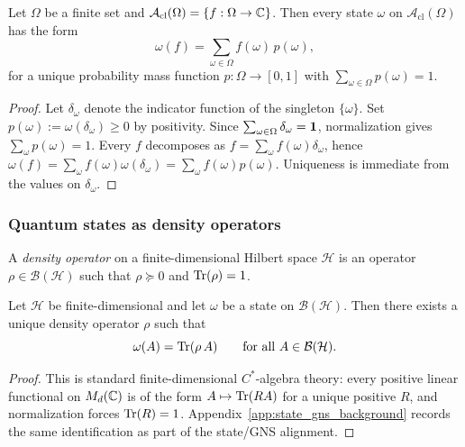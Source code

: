 \begin{proposition}\label{prop:finite_commutative_state_probability}
\MathTag Let $\Omega$ be a finite set and $\mathcal{A}_{\mathrm{cl}}(\Omega)=\{f:\Omega\to\mathbb{C}\}$.
Then every state $\omega$ on $\mathcal{A}_{\mathrm{cl}}(\Omega)$ has the form
\[
\omega(f)=\sum_{\omega\in\Omega} f(\omega)\,p(\omega),
\]
for a unique probability mass function $p:\Omega\to[0,1]$ with $\sum_{\omega\in\Omega}p(\omega)=1$.
\end{proposition}
\begin{proof}
Let $\delta_\omega$ denote the indicator function of the singleton $\{\omega\}$.
Set $p(\omega):=\omega(\delta_\omega)\ge 0$ by positivity.
Since $\sum_{\omega\in\Omega}\delta_\omega=\mathbf{1}$, normalization gives $\sum_{\omega}p(\omega)=1$.
Every $f$ decomposes as $f=\sum_\omega f(\omega)\delta_\omega$, hence $\omega(f)=\sum_\omega f(\omega)\omega(\delta_\omega)=\sum_\omega f(\omega)p(\omega)$.
Uniqueness is immediate from the values on $\delta_\omega$.
\end{proof}

\subsubsection{Quantum states as density operators}

\begin{definition}\label{def:z128_density_operator}
\MathTag A \emph{density operator} on a finite-dimensional Hilbert space $\mathcal{H}$ is an operator $\rho\in\mathcal{B}(\mathcal{H})$ such that $\rho\succeq 0$ and $\mathrm{Tr}(\rho)=1$.
\end{definition}

\begin{proposition}\label{prop:finite_dim_state_density_matrix}
\MathTag Let $\mathcal{H}$ be finite-dimensional and let $\omega$ be a state on $\mathcal{B}(\mathcal{H})$.
Then there exists a unique density operator $\rho$ such that
\[
\omega(A)=\mathrm{Tr}(\rho\,A)\qquad\text{for all }A\in\mathcal{B}(\mathcal{H}).
\]
\end{proposition}
\begin{proof}
This is standard finite-dimensional $C^\ast$-algebra theory: every positive linear functional on $M_d(\mathbb{C})$ is of the form $A\mapsto \mathrm{Tr}(RA)$ for a unique positive $R$, and normalization forces $\mathrm{Tr}(R)=1$.
Appendix~\ref{app:state_gns_background} records the same identification as part of the state/GNS alignment.
\end{proof}

